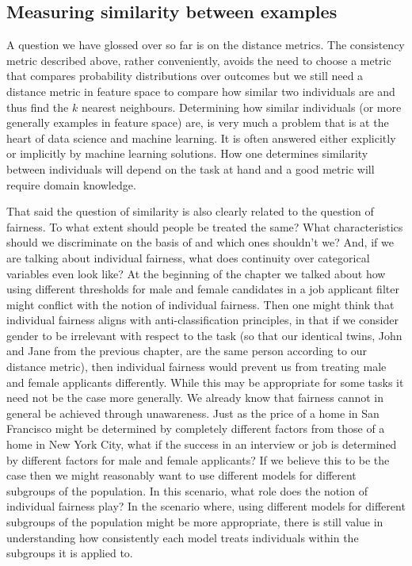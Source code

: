 \subsection{Measuring similarity between examples}

A question we have glossed over so far is on the distance metrics. The consistency metric described above, rather conveniently, avoids the need to choose a metric that compares probability distributions over outcomes but we still need a distance metric in feature space to compare how similar two individuals are and thus find the $k$ nearest neighbours. Determining how similar individuals (or more generally examples in feature space) are, is very much a problem that is at the heart of data science and machine learning. It is often answered either explicitly or implicitly by machine learning solutions. How one determines similarity between individuals will depend on the task at hand and a good metric will require domain knowledge.

That said the question of similarity is also clearly related to the question of fairness. To what extent should people be treated the same? What characteristics should we discriminate on the basis of and which ones shouldn't we? And, if we are talking about individual fairness, what does continuity over categorical variables even look like? At the beginning of the chapter we talked about how using different thresholds for male and female candidates in a job applicant filter might conflict with the notion of individual fairness. Then one might think that individual fairness aligns with anti-classification principles, in that if we consider gender to be irrelevant with respect to the task (so that our identical twins, John and Jane from the previous chapter, are the same person according to our distance metric), then individual fairness would prevent us from treating male and female applicants differently. While this may be appropriate for some tasks it need not be the case more generally. We already know that fairness cannot in general be achieved through unawareness. Just as the price of a home in San Francisco might be determined by completely different factors from those of a home in New York City, what if the success in an interview or job is determined by different factors for male and female applicants? If we believe this to be the case then we might reasonably want to use different models for different subgroups of the population. In this scenario, what role does the notion of individual fairness play? In the scenario where, using different models for different subgroups of the population might be more appropriate, there is still value in understanding how consistently each model treats individuals within the subgroups it is applied to.


